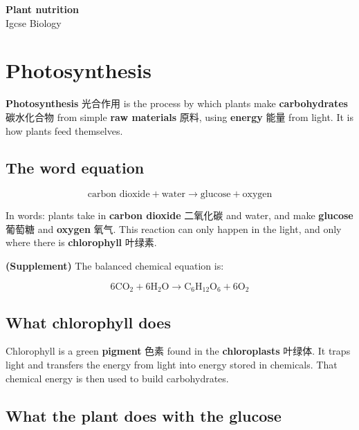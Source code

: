 \documentclass[11pt]{article}
\begin{document}
\begin{center}
  {\LARGE\bfseries Plant nutrition}\\[0.35em]
  {\large Igcse Biology}
\end{center}
\vspace{0.6em}

\section*{Photosynthesis}

\textbf{Photosynthesis} 光合作用 is the process by which plants make \textbf{carbohydrates} 碳水化合物 from simple \textbf{raw materials} 原料, using \textbf{energy} 能量 from light. It is how plants feed themselves.

\subsection*{The word equation}

\[
\text{carbon dioxide} + \text{water} \rightarrow \text{glucose} + \text{oxygen}
\]

In words: plants take in \textbf{carbon dioxide} 二氧化碳 and water, and make \textbf{glucose} 葡萄糖 and \textbf{oxygen} 氧气. This reaction can only happen in the light, and only where there is \textbf{chlorophyll} 叶绿素.

\textbf{(Supplement)} The balanced chemical equation is:

\[
6\text{CO}_2 + 6\text{H}_2\text{O} \rightarrow \text{C}_6\text{H}_{12}\text{O}_6 + 6\text{O}_2
\]

\subsection*{What chlorophyll does}

Chlorophyll is a green \textbf{pigment} 色素 found in the \textbf{chloroplasts} 叶绿体. It traps light and transfers the energy from light into energy stored in chemicals. That chemical energy is then used to build carbohydrates.

\subsection*{What the plant does with the glucose}
\end{document}
